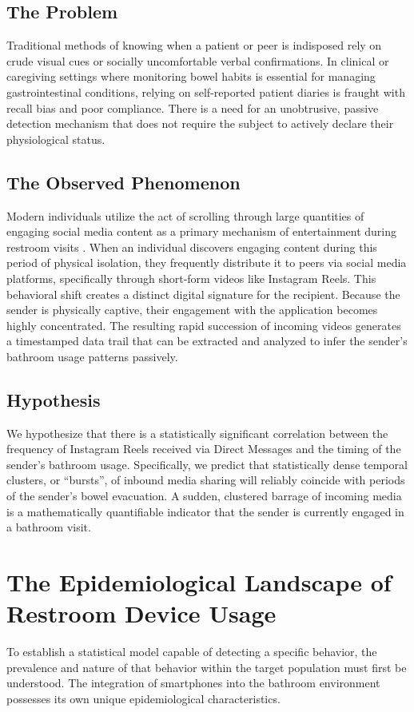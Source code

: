 \documentclass[twocolumn]{article}
\begin{document}
\subsection{The Problem}
Traditional methods of knowing when a patient or peer is indisposed rely on crude visual cues or socially uncomfortable verbal confirmations. In clinical or caregiving settings where monitoring bowel habits is essential for managing gastrointestinal conditions, relying on self-reported patient diaries is fraught with recall bias and poor compliance. There is a need for an unobtrusive, passive detection mechanism that does not require the subject to actively declare their physiological status.

\subsection{The Observed Phenomenon}
Modern individuals utilize the act of scrolling through large quantities of engaging social media content as a primary mechanism of entertainment during restroom visits \cite{qssupplies}. When an individual discovers engaging content during this period of physical isolation, they frequently distribute it to peers via social media platforms, specifically through short-form videos like Instagram Reels. This behavioral shift creates a distinct digital signature for the recipient. Because the sender is physically captive, their engagement with the application becomes highly concentrated. The resulting rapid succession of incoming videos generates a timestamped data trail that can be extracted and analyzed to infer the sender's bathroom usage patterns passively.

\subsection{Hypothesis}
We hypothesize that there is a statistically significant correlation between the frequency of Instagram Reels received via Direct Messages and the timing of the sender's bathroom usage. Specifically, we predict that statistically dense temporal clusters, or ``bursts'', of inbound media sharing will reliably coincide with periods of the sender's bowel evacuation. A sudden, clustered barrage of incoming media is a mathematically quantifiable indicator that the sender is currently engaged in a bathroom visit.

\section{The Epidemiological Landscape of Restroom Device Usage}
To establish a statistical model capable of detecting a specific behavior, the prevalence and nature of that behavior within the target population must first be understood. The integration of smartphones into the bathroom environment possesses its own unique epidemiological characteristics.
\end{document}
